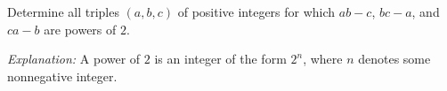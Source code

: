 Determine all triples $(a, b, c)$ of positive integers for which $ab - c$, $bc - a$, and $ca - b$ are powers of $2$.

\emph{Explanation:} A power of $2$ is an integer of the form $2^n$, where $n$ denotes some nonnegative integer.
